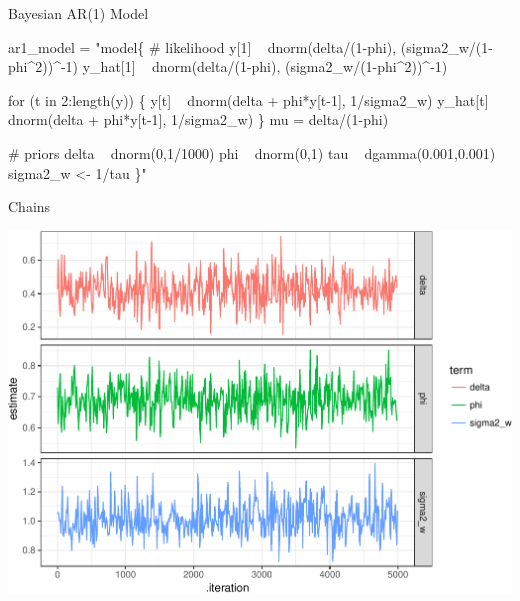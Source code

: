 \documentclass[11pt,ignorenonframetext,]{beamer}
\newenvironment{Shaded}{}{}
\newcommand{\NormalTok}[1]{#1}
\newcommand{\StringTok}[1]{\textcolor[rgb]{0.25,0.44,0.63}{#1}}
\let\oldShaded\Shaded
\let\endoldShaded\endShaded
\renewenvironment{Shaded}{\footnotesize\begin{spacing}{0.9}\oldShaded}{\endoldShaded\end{spacing}}
\begin{document}
\begin{frame}[fragile,t]{%
\protect\hypertarget{bayesian-ar1-model}{%
Bayesian AR(1) Model}}

\begin{Shaded}
\begin{Highlighting}[]
\NormalTok{ar1_model =}\StringTok{ "model\{}
\StringTok{# likelihood}
\StringTok{  y[1] ~ dnorm(delta/(1-phi), (sigma2_w/(1-phi^2))^-1)}
\StringTok{  y_hat[1] ~ dnorm(delta/(1-phi), (sigma2_w/(1-phi^2))^-1)}

\StringTok{  for (t in 2:length(y)) \{}
\StringTok{    y[t] ~ dnorm(delta + phi*y[t-1], 1/sigma2_w)}
\StringTok{    y_hat[t] ~ dnorm(delta + phi*y[t-1], 1/sigma2_w)}
\StringTok{  \}}
\StringTok{  }
\StringTok{  mu = delta/(1-phi)}

\StringTok{# priors}
\StringTok{  delta ~ dnorm(0,1/1000)}
\StringTok{  phi ~ dnorm(0,1)}
\StringTok{  tau ~ dgamma(0.001,0.001)}
\StringTok{  sigma2_w <- 1/tau}
\StringTok{\}"}
\end{Highlighting}
\end{Shaded}

\end{frame}

\begin{frame}{%
\protect\hypertarget{chains}{%
Chains}}

\begin{center}\includegraphics[width=\textwidth]{Lec10_files/figure-beamer/unnamed-chunk-7-1} \end{center}

\end{frame}
\end{document}
